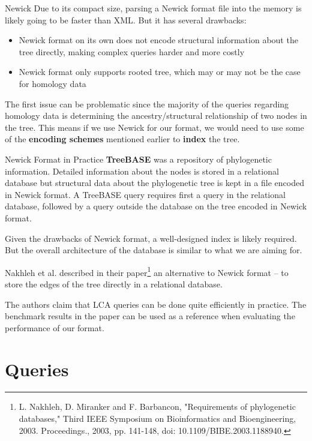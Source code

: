 \documentclass{beamer}
\begin{document}
\begin{frame}{Newick}
    Due to its compact size, parsing a Newick format file into the memory is likely going to be faster than XML. But it has several drawbacks:
    \begin{itemize}
        \item Newick format on its own does not encode structural information about the tree directly, making complex queries harder and more costly
        \item Newick format only supports rooted tree, which may or may not be the case for homology data
    \end{itemize}
    The first issue can be problematic since the majority of the queries regarding homology data is determining the ancestry/structural relationship of two nodes in the tree. This means if we use Newick for our format, we would need to use some of the \textbf{encoding schemes} mentioned earlier to \textbf{index} the tree.
\end{frame}

\begin{frame}{Newick Format in Practice}
    \textbf{TreeBASE} was a repository of phylogenetic information. Detailed information about the nodes is stored in a relational database but structural data about the phylogenetic tree is kept in a file encoded in Newick format. A TreeBASE query requires first a query in the relational database, followed by a query outside the database on the tree encoded in Newick format.

    Given the drawbacks of Newick format, a well-designed index is likely required. But the overall architecture of the database is similar to what we are aiming for.
\end{frame}

\begin{frame}
    Nakhleh et al. described in their paper\footnote{L. Nakhleh, D. Miranker and F. Barbancon, "Requirements of phylogenetic databases," Third IEEE Symposium on Bioinformatics and Bioengineering, 2003. Proceedings., 2003, pp. 141-148, doi: 10.1109/BIBE.2003.1188940.} an alternative to Newick format -- to store the edges of the tree directly in a relational database.

    The authors claim that LCA queries can be done quite efficiently in practice. The benchmark results in the paper can be used as a reference when evaluating the performance of our format.
\end{frame}

\section{Queries}
\end{document}
